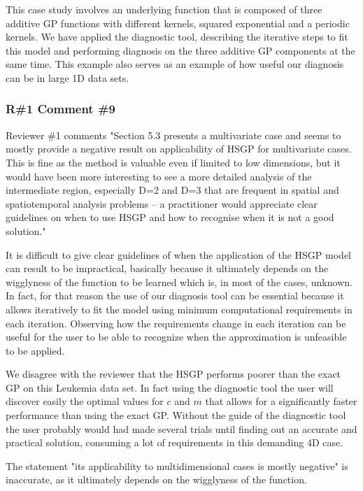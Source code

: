 \documentclass[11pt]{report}
\begin{document}
This case study involves an underlying function that is composed of three additive GP functions with different kernels, squared exponential and a periodic kernels. We have applied the diagnostic tool, describing the iterative steps to fit this model and performing diagnosis on the three additive GP components at the same time. This example also serves as an example of how useful our diagnosis can be in large 1D data sets.

\subsubsection*{R\#1 Comment \#9}

Reviewer \#1 comments "Section 5.3 presents a multivariate case and seems to mostly provide a negative result on applicability of HSGP for multivariate cases. This is fine as the method is valuable even if limited to low dimensions, but it would have been more interesting to see a more detailed analysis of the intermediate region, especially D=2 and D=3 that are frequent in spatial and spatiotemporal analysis problems -- a practitioner would appreciate clear guidelines on when to use HSGP and how to recognise when it is not a good solution."

It is difficult to give clear guidelines of when the application of the HSGP model can result to be impractical, basically because it ultimately depends on the wigglyness of the function to be learned which is, in most of the cases, unknown. In fact, for that reason the use of our diagnosis tool can be essential because it allows iteratively to fit the model using minimum computational requirements in each iteration. Observing how the requirements change in each iteration can be useful for the user to be able to recognize when the approximation is unfeasible to be applied.

We disagree with the reviewer that the HSGP performs poorer than the exact GP on this Leukemia data set. In fact using the diagnostic tool the user will discover easily the optimal values for $c$ and $m$ that allows for a significantly faster performance than using the exact GP. Without the guide of the diagnostic tool the user probably would had made several trials until finding out an accurate and practical solution, consuming a lot of requirements in this demanding 4D case.

The statement "its applicability to multidimensional cases is mostly negative" is inaccurate, as it ultimately depends on the wigglyness of the function.
\end{document}

